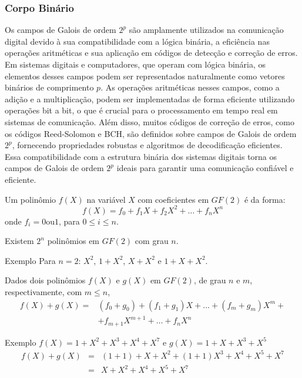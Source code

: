\documentclass[portuguese,aspectratio=169]{beamer}
\begin{document}
\begin{frame}[allowframebreaks]
  \frametitle{Corpo Binário} 
  Os campos de Galois de ordem $2^p$ são amplamente utilizados na comunicação
  digital devido à sua compatibilidade com a lógica binária, a eficiência nas
  operações aritméticas e sua aplicação em códigos de detecção e correção de
  erros. Em sistemas digitais e computadores, que operam com lógica binária, os
  elementos desses campos podem ser representados naturalmente como vetores
  binários de comprimento $p$. As operações aritméticas nesses campos, como a
  adição e a multiplicação, podem ser implementadas de forma eficiente
  utilizando operações bit a bit, o que é crucial para o processamento em tempo
  real em sistemas de comunicação. Além disso, muitos códigos de correção de
  erros, como os códigos Reed-Solomon e BCH, são definidos sobre campos de
  Galois de ordem $2^p$, fornecendo propriedades robustas e algoritmos de
  decodificação eficientes. Essa compatibilidade com a estrutura binária dos
  sistemas digitais torna os campos de Galois de ordem $2^p$ ideais para
  garantir uma comunicação confiável e eficiente.


  \framebreak

  Um polinômio $f(X)$ na variável $X$ com coeficientes em $GF(2)$ é da forma:
  \begin{equation}
    f(X) = f_0 + f_1 X + f_2 X^2 + \ldots + f_n X^n
  \end{equation}
  onde $f_i = 0 \text{ou} 1$, para $0 \leq i \leq n$.

  Existem $2^n$ polinômios em $GF(2)$ com grau $n$.
  \begin{block}{Exemplo}
  Para $n=2$: $X^2$, $1+X^2$, $X+X^2$ e $1+X+X^2$.
  \end{block}

  Dados dois polinômios $f(X)$ e $g(X)$ em $GF(2)$, de grau $n$ e $m$, respectivamente, com $m \leq n$,
  \begin{eqnarray}
    f(X) + g(X) =& (f_0 + g_0) + (f_1 + g_1) X + \ldots + (f_m + g_m) X^m + \nonumber\\
                  & + f_{m+1} X^{m+1} + \ldots + f_n X^n
  \end{eqnarray}
  \begin{block}{Exemplo}
    $f(X) = 1 + X^2 + X^3 + X^4 + X^7$ e $g(X) = 1 + X + X^3 + X^5$ 
    \begin{eqnarray}
      f(X) + g(X) &=& (1+1) + X + X^2 + (1+1) X^3 + X^4 + X^5 + X^7 \nonumber\\
                  &=& X + X^2 + X^4 + X^5 + X^7
    \end{eqnarray}
  \end{block}


\end{frame}
\end{document}
